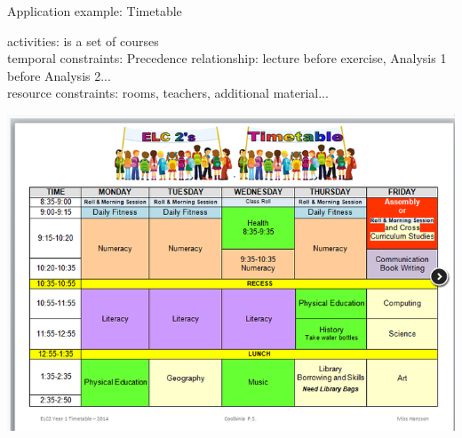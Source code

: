 \begin{frame}{Application example: Timetable}
  
  { activities: } is a set of courses\\[0.2cm]
          { temporal constraints: } Precedence relationship: lecture before
            exercise, Analysis 1 before Analysis 2...\\[0.2cm]

         { resource constraints: }rooms, teachers, additional material...\\[0.2cm]

         \vfill
      \begin{center}
      \includegraphics[scale=0.25]{figures/timetable.png}
    \end{center}
\vspace{-0.5cm}    
\end{frame}


